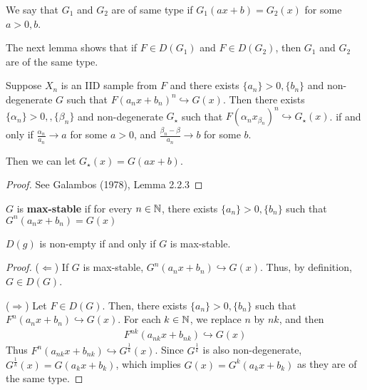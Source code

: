 We say that $G_{1}$ and $G_{2}$ are of same type if $G_{1}(ax + b) =
G_{2}(x)$ for some $a > 0, b$.

The next lemma shows that if $F \in D(G_{1})$ and $F \in D(G_{2})$,
then $G_{1}$ and $G_{2}$ are of the same type.

\begin{lem}
  Suppose $X_{n}$ is an IID sample from $F$ and there exists $\{ a_{n}
  \} > 0, \{ b_{n} \}$ and non-degenerate $G$ such that $F(a_{n} x
  +b_{n})^{n} \hookrightarrow G(x)$. Then there exists $\{ \alpha_{n}
  \} > 0, , \{ \beta_{n} \}$ and non-degenerate $G_{\star}$ such that
  $F(\alpha_{n} x _{ \beta_{n}})^{n} \hookrightarrow G_{\star}(x)$. if
  and only if $\frac{\alpha_{n}}{a_{n}} \rightarrow a$ for some $a >
  0$, and $\frac{\beta_{n} - \beta}{a_{n}} \rightarrow b$ for some
  $b$.

Then we can let $G_{\star}(x) = G(ax + b)$.
\end{lem}

\begin{proof}
  See Galambos (1978), Lemma 2.2.3
\end{proof}

\begin{defn}
  \label{defn:extreme_value_theory:1}
  $G$ is \textbf{max-stable} if for every $n \in \mathbb{N}$, there exists
  $\{ a_{n} \} > 0, \{ b_{n} \} $ such that $G^{n}(a_{n}x + b_{n}) = G(x)$
\end{defn}

\begin{thm}
  \label{defn:extreme_value_theory:2}
  $D(g)$ is non-empty if and only if $G$ is max-stable.
\end{thm}

\begin{proof}
  ($\Leftarrow$) If $G$ is max-stable, $G^{n}(a_{n} x + b_{n}) \hookrightarrow
  G(x)$.  Thus, by definition, $G \in D(G)$.

  ($\Rightarrow$) Let $F \in D(G)$. Then, there exists $\{ a_{n} \} > 0, \{ b_{n}
  \}$ such that $F^{n}(a_{n} x + b_{n}) \hookrightarrow G(x)$.  For
  each $k \in \mathbb{N}$, we replace $n$ by $nk$, and then
  \begin{align}
    \label{eq:121}
    F^{nk}(a_{nk} x + b_{nk}) \hookrightarrow G(x)
  \end{align}
  Thus $F^{n}(a_{nk} x + b_{nk}) \hookrightarrow G^{\frac{1}{k}}(x)$.
  Since $G^{\frac{1}{k}}$ is also non-degenerate, $G^{\frac{1}{k}}(x)
  = G(a_{k} x + b_{k})$, which implies $G(x) = G^{k}(a_{k} x + b_{k})$
  as they are of the same type.
\end{proof}

